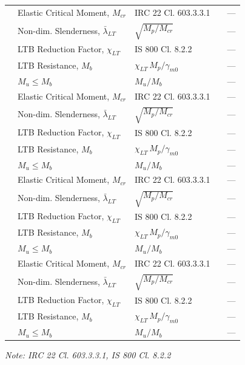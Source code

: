 \documentclass[12pt,a4paper]{report}
\numberwithin{table}{chapter}
\numberwithin{figure}{chapter}
\begin{document}
\begin{longtable}{|C{2.5cm}|C{3.5cm}|C{3.5cm}|>{\centering\arraybackslash}p{4.2cm}|C{1.8cm}|}
 & Elastic Critical Moment, $M_{cr}$ & IRC 22 Cl. 603.3.3.1 &  & --- \\[6pt]
 & Non-dim. Slenderness, $\bar{\lambda}_{LT}$ & $\sqrt{M_p / M_{cr}}$ &  & --- \\[6pt]
 & LTB Reduction Factor, $\chi_{LT}$ & IS 800 Cl. 8.2.2 &  & --- \\[6pt]
 & LTB Resistance, $M_b$ & $\chi_{LT}\,M_p / \gamma_{m0}$ &  & --- \\[6pt]
 & $M_u \leq M_b$ & $M_u / M_b$ &  & --- \\[6pt]
\hline
{} & Elastic Critical Moment, $M_{cr}$ & IRC 22 Cl. 603.3.3.1 &  & --- \\[6pt]
 & Non-dim. Slenderness, $\bar{\lambda}_{LT}$ & $\sqrt{M_p / M_{cr}}$ &  & --- \\[6pt]
 & LTB Reduction Factor, $\chi_{LT}$ & IS 800 Cl. 8.2.2 &  & --- \\[6pt]
 & LTB Resistance, $M_b$ & $\chi_{LT}\,M_p / \gamma_{m0}$ &  & --- \\[6pt]
 & $M_u \leq M_b$ & $M_u / M_b$ &  & --- \\[6pt]
\hline
{} & Elastic Critical Moment, $M_{cr}$ & IRC 22 Cl. 603.3.3.1 &  & --- \\[6pt]
 & Non-dim. Slenderness, $\bar{\lambda}_{LT}$ & $\sqrt{M_p / M_{cr}}$ &  & --- \\[6pt]
 & LTB Reduction Factor, $\chi_{LT}$ & IS 800 Cl. 8.2.2 &  & --- \\[6pt]
 & LTB Resistance, $M_b$ & $\chi_{LT}\,M_p / \gamma_{m0}$ &  & --- \\[6pt]
 & $M_u \leq M_b$ & $M_u / M_b$ &  & --- \\[6pt]
\hline
{} & Elastic Critical Moment, $M_{cr}$ & IRC 22 Cl. 603.3.3.1 &  & --- \\[6pt]
 & Non-dim. Slenderness, $\bar{\lambda}_{LT}$ & $\sqrt{M_p / M_{cr}}$ &  & --- \\[6pt]
 & LTB Reduction Factor, $\chi_{LT}$ & IS 800 Cl. 8.2.2 &  & --- \\[6pt]
 & LTB Resistance, $M_b$ & $\chi_{LT}\,M_p / \gamma_{m0}$ &  & --- \\[6pt]
 & $M_u \leq M_b$ & $M_u / M_b$ &  & --- \\[6pt]
\hline
\end{longtable}
\noindent\textit{Note: IRC 22 Cl. 603.3.3.1, IS 800 Cl. 8.2.2}
\end{document}
